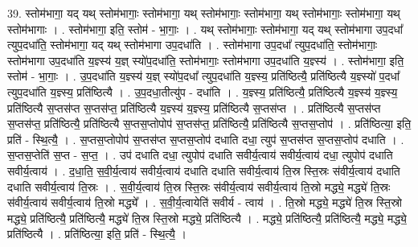 \documentclass[17pt]{extarticle}
\begin{document}
39. स्तोम॑भागा॒ यद् यथ् स्तोम॑भागाः॒ स्तोम॑भागा॒ यथ् स्तोम॑भागाः॒ स्तोम॑भागा॒ यथ् स्तोम॑भागाः॒ स्तोम॑भागा॒ यथ् स्तोम॑भागाः । . स्तोम॑भागा॒ इति॒ स्तोम॑ - भा॒गाः॒ । . यथ् स्तोम॑भागाः॒ स्तोम॑भागा॒ यद् यथ् स्तोम॑भागा उप॒दधा᳚ त्युप॒दधा॑ति॒ स्तोम॑भागा॒ यद् यथ् स्तोम॑भागा उप॒दधा॑ति । . स्तोम॑भागा उप॒दधा᳚ त्युप॒दधा॑ति॒ स्तोम॑भागाः॒ स्तोम॑भागा उप॒दधा॑ति य॒ज्ञ्स्य॑ य॒ज्ञ् स्यो॑प॒दधा॑ति॒ स्तोम॑भागाः॒ स्तोम॑भागा उप॒दधा॑ति य॒ज्ञ्स्य॑ । . स्तोम॑भागा॒ इति॒ स्तोम॑ - भा॒गाः॒ । . उ॒प॒दधा॑ति य॒ज्ञ्स्य॑ य॒ज्ञ् स्यो॑प॒दधा᳚ त्युप॒दधा॑ति य॒ज्ञ्स्य॒ प्रति॑ष्ठित्यै॒ प्रति॑ष्ठित्यै य॒ज्ञ्स्यो॑ प॒दधा᳚ त्युप॒दधा॑ति य॒ज्ञ्स्य॒ प्रति॑ष्ठित्यै । . उ॒प॒दधा॒तीत्यु॑प - दधा॑ति । . य॒ज्ञ्स्य॒ प्रति॑ष्ठित्यै॒ प्रति॑ष्ठित्यै य॒ज्ञ्स्य॑ य॒ज्ञ्स्य॒ प्रति॑ष्ठित्यै स॒प्तस॑प्त स॒प्तस॑प्त॒ प्रति॑ष्ठित्यै य॒ज्ञ्स्य॑ य॒ज्ञ्स्य॒ प्रति॑ष्ठित्यै स॒प्तस॑प्त । . प्रति॑ष्ठित्यै स॒प्तस॑प्त स॒प्तस॑प्त॒ प्रति॑ष्ठित्यै॒ प्रति॑ष्ठित्यै स॒प्तस॒प्तोपोप॑ स॒प्तस॑प्त॒ प्रति॑ष्ठित्यै॒ प्रति॑ष्ठित्यै स॒प्तस॒प्तोप॑ । . प्रति॑ष्ठित्या॒ इति॒ प्रति॑ - स्थि॒त्यै॒ । . स॒प्तस॒प्तोपोप॑ स॒प्तस॑प्त स॒प्तस॒प्तोप॑ दधाति दधा॒ त्युप॑ स॒प्तस॑प्त स॒प्तस॒प्तोप॑ दधाति । . स॒प्तस॒प्तेति॑ स॒प्त - स॒प्त॒ । . उप॑ दधाति दधा॒ त्युपोप॑ दधाति सवीर्य॒त्वाय॑ सवीर्य॒त्वाय॑ दधा॒ त्युपोप॑ दधाति सवीर्य॒त्वाय॑ । . द॒धा॒ति॒ स॒वी॒र्य॒त्वाय॑ सवीर्य॒त्वाय॑ दधाति दधाति सवीर्य॒त्वाय॑ ति॒स्र स्ति॒स्रः स॑वीर्य॒त्वाय॑ दधाति दधाति सवीर्य॒त्वाय॑ ति॒स्रः । . स॒वी॒र्य॒त्वाय॑ ति॒स्र स्ति॒स्रः स॑वीर्य॒त्वाय॑ सवीर्य॒त्वाय॑ ति॒स्रो मद्ध्ये॒ मद्ध्ये॑ ति॒स्रः स॑वीर्य॒त्वाय॑ सवीर्य॒त्वाय॑ ति॒स्रो मद्ध्ये᳚ । . स॒वी॒र्य॒त्वायेति॑ सवीर्य - त्वाय॑ । . ति॒स्रो मद्ध्ये॒ मद्ध्ये॑ ति॒स्र स्ति॒स्रो मद्ध्ये॒ प्रति॑ष्ठित्यै॒ प्रति॑ष्ठित्यै॒ मद्ध्ये॑ ति॒स्र स्ति॒स्रो मद्ध्ये॒ प्रति॑ष्ठित्यै । . मद्ध्ये॒ प्रति॑ष्ठित्यै॒ प्रति॑ष्ठित्यै॒ मद्ध्ये॒ मद्ध्ये॒ प्रति॑ष्ठित्यै । . प्रति॑ष्ठित्या॒ इति॒ प्रति॑ - स्थि॒त्यै॒ । \newline
\pagebreak
{}
\end{document}
